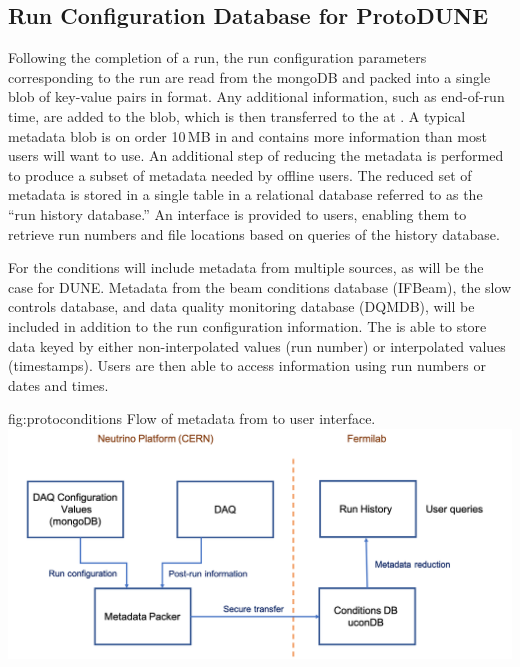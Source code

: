 \documentclass[../main-v1.tex]{subfiles}
\begin{document}
\subsection{Run Configuration Database for ProtoDUNE}
\label{sec:runconfigPD}

 Following the completion of a run, the run configuration parameters corresponding to the run are read from the mongoDB and packed into a single %
 blob of key-value pairs in  format. Any additional information, such as end-of-run time, are added to the blob, which is then transferred to the  at . A typical metadata blob is on order 10\,MB in and contains more information than most users will want to use. An additional step of reducing the metadata is performed to produce a subset of metadata needed by offline users. The reduced set of metadata is stored in a single table in a relational database referred to as the ``run history database.'' An interface is provided to users, enabling them to retrieve run numbers and file locations based on queries of the history database. 

For %
 the conditions  will include metadata from multiple sources, as will be the case for DUNE. Metadata from the beam conditions database (IFBeam), the slow controls database, and data quality monitoring database (DQMDB), will be included in addition to the run configuration information. The  is able to store data keyed by either non-interpolated values (run number) or interpolated values (timestamps). Users are then able to access information using run numbers or dates and times.

\begin{dunefigure}
{fig:protoconditions} 
{Flow of metadata from   to user interface.}
\includegraphics[width=.9\columnwidth]{graphics/Databases/Conditions_ProtoDUNE.png}
\end{dunefigure}
\end{document}
